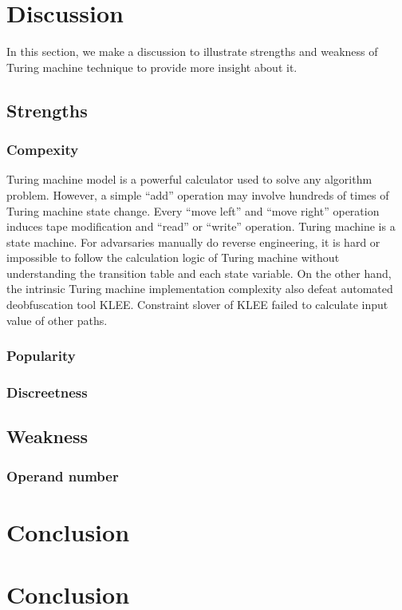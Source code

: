 \documentclass[lnicst]{svmultln}
\begin{document}
\section{Discussion}
In this section, we make a discussion to illustrate strengths and weakness of Turing machine technique to provide more insight about it.
\subsection{Strengths}
\subsubsection{Compexity}
Turing machine model is a  powerful calculator used to solve any algorithm problem. However, a simple ``add'' operation may involve hundreds of times of Turing machine state change. Every ``move left'' and ``move right'' operation induces tape modification and ``read'' or ``write'' operation. Turing machine is a state machine. For advarsaries manually do reverse engineering, it is hard or impossible to follow the calculation logic of Turing machine  without understanding the transition table and each state variable. On the other hand, the intrinsic Turing machine implementation complexity also defeat automated deobfuscation tool KLEE. Constraint slover of KLEE failed to calculate input value of other paths. 
\subsubsection{Popularity}
\subsubsection{Discreetness}
\subsection{Weakness}
\subsubsection{Operand number}
\section{Conclusion}
\section{Conclusion}
\end{document}
